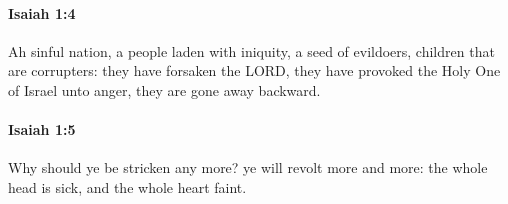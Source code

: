 		\paragraph{Isaiah 1:4} %
			\label{ISAIAH-1-4}

			Ah sinful nation, a people laden with iniquity, a seed of evildoers, children that are corrupters: they have forsaken the LORD, they have provoked the Holy One of Israel unto anger, they are gone away backward.


		\paragraph{Isaiah 1:5} %
			\label{ISAIAH-1-5}

			Why should ye be stricken any more? ye will revolt more and more: the whole head is sick, and the whole heart faint.


